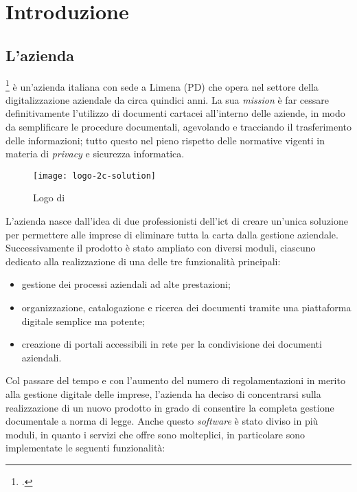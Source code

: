 
\chapter{Introduzione}
\label{cap:introduzione}

\section{L'azienda}

\myCompany{} \companyTitle{}\footcite{site:2c-solution} è un'azienda italiana con sede a Limena (PD) che opera nel settore della digitalizzazione aziendale da circa quindici anni. La sua \textit{mission} è far cessare definitivamente l'utilizzo di documenti cartacei all'interno delle aziende, in modo da semplificare le procedure documentali, agevolando e tracciando il trasferimento delle informazioni; tutto questo nel pieno rispetto delle normative vigenti in materia di \textit{privacy} e sicurezza informatica.

\begin{figure}[!h] 
	\centering 
	\texttt{[image: logo-2c-solution]} 
	\caption{Logo di \myCompany{} \companyTitle}
\end{figure}

L'azienda nasce dall'idea di due professionisti dell'\gls{ict}\glsfirstoccur{} di creare un'unica soluzione per permettere alle imprese di eliminare tutta la carta dalla gestione aziendale. Successivamente il prodotto è stato ampliato con diversi moduli, ciascuno dedicato alla realizzazione di una delle tre funzionalità principali:

\begin{itemize}
	\item gestione dei processi aziendali ad alte prestazioni;
	\item organizzazione, catalogazione e ricerca dei documenti tramite una piattaforma digitale semplice ma potente;
	\item creazione di portali accessibili in rete per la condivisione dei documenti aziendali.
\end{itemize}

Col passare del tempo e con l'aumento del numero di regolamentazioni in merito alla gestione digitale delle imprese, l'azienda ha deciso di concentrarsi sulla realizzazione di un nuovo prodotto in grado di consentire la completa gestione documentale a norma di legge. Anche questo \textit{software} è stato diviso in più moduli, in quanto i servizi che offre sono molteplici, in particolare sono implementate le seguenti funzionalità:

